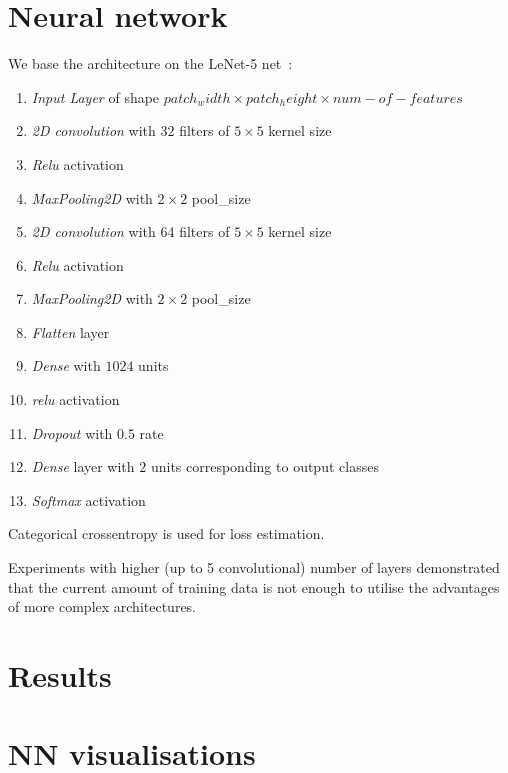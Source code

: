 \documentclass[11pt,a4paper]{article}
\begin{document}
\section{Neural network}
We base the architecture on the LeNet-5 net~\cite{lecun1998gradient}:
\begin{enumerate}
\item \textit{Input Layer} of shape $patch_width \times patch_height \times num-of-features$
\item \textit{2D convolution} with $32$ filters of $5 \times 5$ kernel size
\item \textit{Relu} activation
\item \textit{MaxPooling2D} with $2 \times 2$ pool_size
\item \textit{2D convolution} with 64 filters of $5 \times 5$ kernel size
\item \textit{Relu} activation
\item \textit{MaxPooling2D} with $2 \times 2$ pool_size
\item \textit{Flatten} layer
\item \textit{Dense} with $1024$ units
\item \textit{relu} activation
\item \textit{Dropout} with $0.5$ rate
\item \textit{Dense} layer with $2$ units corresponding to output classes
\item \textit{Softmax} activation
\end{enumerate}
Categorical crossentropy is used for loss estimation.

Experiments with higher (up to 5 convolutional) number of layers demonstrated that the current amount of training data is not enough to utilise the advantages of more complex architectures.

\section{Results}

\section{NN visualisations}

\printbibliography
\end{document}
